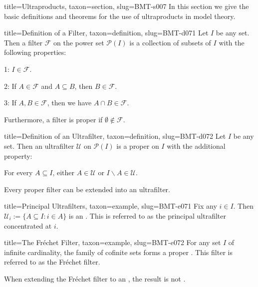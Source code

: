 \documentclass[a4paper]{article}
\begin{document}
\begin{tree}{title={Ultraproducts}, taxon={section}, slug={BMT-s007}}
In this section we give the basic definitions and theorems for the use of ultraproducts in model theory.
\begin{tree}{title={Definition of a Filter}, taxon={definition}, slug={BMT-d071}}
Let \(I\) be any set. Then a filter \(\mathcal {F}\) on the power set \(\mathcal {P}(I)\) is a collection of subsets of \(I\) with the following properties:\par{1: \(I \in \mathcal {F}\).}\par{2: If \(A \in   \mathcal {F}\) and \(A \subseteq  B\), then \(B \in   \mathcal {F}\).}\par{3: If \(A,B  \in   \mathcal {F}\), then we have \(A \cap  B \in   \mathcal {F}\).}\par{Furthermore, a filter is proper if \(\emptyset \notin \mathcal {F}\).}
\end{tree}

\begin{tree}{title={Definition of an Ultrafilter}, taxon={definition}, slug={BMT-d072}}
Let \(I\) be any set. Then an ultrafilter \(\mathcal {U}\) on \(\mathcal {P}(I)\) is a proper  on \(I\) with the additional property:\par{For every \(A \subseteq  I\), either \(A \in \mathcal {U}\) or \(I \backslash  A \in \mathcal {U}\).}\par{Every proper filter can be extended into an ultrafilter.}
\end{tree}

\begin{tree}{title={Principal Ultrafilters}, taxon={example}, slug={BMT-e071}}
Fix any \(i \in  I\). Then \(\mathcal {U}_i :=  \{ A \subseteq  I: i \in  A \}\) is an . This is referred to as the principal ultrafilter concentrated at \(i\).
\end{tree}

\begin{tree}{title={The Fréchet Filter}, taxon={example}, slug={BMT-e072}}
For any set \(I\) of infinite cardinality, the family of cofinite sets forms a proper . This filter is referred to as the Fréchet filter.\par{When extending the Fréchet filter to an , the result is not .}
\end{tree}


\end{tree}
\end{document}
